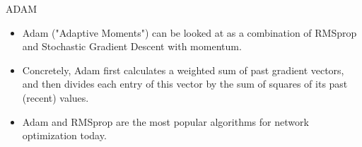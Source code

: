 \documentclass[handout,xcolor=pdftex,dvipsnames,table,mathserif]{beamer}
\begin{document}


\begin{frame}{ADAM \cite{kingma2014adam}}
\begin{itemize}
\item Adam ("Adaptive Moments") can be looked at as a combination of RMSprop and Stochastic Gradient Descent with momentum.
\item Concretely, Adam first calculates a weighted sum of past gradient vectors, and then divides each entry of this vector by the sum of squares of its past (recent) values. 
\item Adam and RMSprop are the most popular algorithms for network optimization today. 
\end{itemize}
\end{frame}
\end{document}
